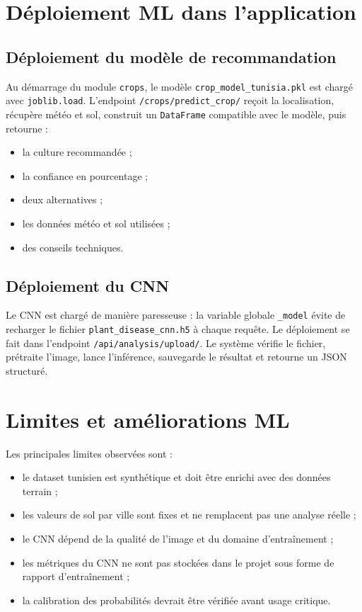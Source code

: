 \documentclass[12pt,a4paper]{report}
\begin{document}
\section{Déploiement ML dans l'application}
\subsection{Déploiement du modèle de recommandation}
Au démarrage du module \texttt{crops}, le modèle \texttt{crop\_model\_tunisia.pkl} est chargé avec \texttt{joblib.load}. L'endpoint \texttt{/crops/predict\_crop/} reçoit la localisation, récupère météo et sol, construit un \texttt{DataFrame} compatible avec le modèle, puis retourne :
\begin{itemize}[noitemsep]
  \item la culture recommandée ;
  \item la confiance en pourcentage ;
  \item deux alternatives ;
  \item les données météo et sol utilisées ;
  \item des conseils techniques.
\end{itemize}

\subsection{Déploiement du CNN}
Le CNN est chargé de manière paresseuse : la variable globale \texttt{\_model} évite de recharger le fichier \texttt{plant\_disease\_cnn.h5} à chaque requête. Le déploiement se fait dans l'endpoint \texttt{/api/analysis/upload/}. Le système vérifie le fichier, prétraite l'image, lance l'inférence, sauvegarde le résultat et retourne un JSON structuré.

\section{Limites et améliorations ML}
Les principales limites observées sont :
\begin{itemize}[noitemsep]
  \item le dataset tunisien est synthétique et doit être enrichi avec des données terrain ;
  \item les valeurs de sol par ville sont fixes et ne remplacent pas une analyse réelle ;
  \item le CNN dépend de la qualité de l'image et du domaine d'entraînement ;
  \item les métriques du CNN ne sont pas stockées dans le projet sous forme de rapport d'entraînement ;
  \item la calibration des probabilités devrait être vérifiée avant usage critique.
\end{itemize}
\end{document}
